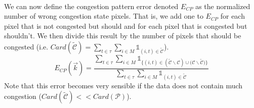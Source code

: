 \\
We can now define the congestion pattern error denoted $E_{CP}$ as the normalized number of wrong congestion state pixels. That is, we add one to $E_{CP}$ for each pixel that is not congested but should and for each pixel that is congested but shouldn't. We then divide this result by the number of pixels that should be congested (i.e. $Card(\widetilde{\mathscr{C}})=\sum_{t\in{\tau}}\sum_{i\in{M}}\mathds{1}_{(i,t)\in{\widetilde{\mathscr{C}}}}$).
\begin{equation*}
	E_{CP}(\vec{k})=\frac{\sum_{t\in{\tau}}\sum_{i\in{M}}\mathds{1}_{\{(i,t)\in{(\widetilde{\mathscr{C}}\backslash \mathscr{C})\cup(\mathscr{C}\backslash \widetilde{\mathscr{C}} })\}}}{\sum_{t\in{\tau}}\sum_{i\in{M}}\mathds{1}_{(i,t)\in{\widetilde{\mathscr{C}}}}}
\end{equation*}
Note that this error becomes very sensible if the data does not contain much congestion ($Card(\widetilde{\mathscr{C}})<<Card(\mathscr{P})$).
